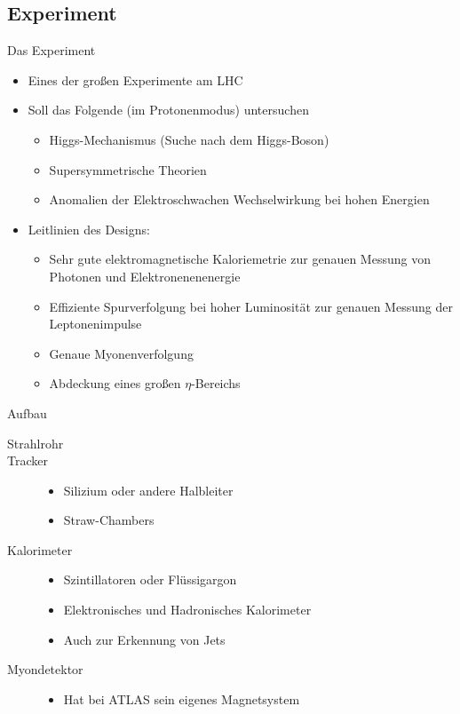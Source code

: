 \documentclass{beamer}
\begin{document}
\subsection{Experiment}
\begin{frame}{Das Experiment}
  \begin{itemize}
    \item Eines der großen Experimente am LHC
    \item Soll das Folgende (im Protonenmodus) untersuchen
      \begin{itemize}
        \item Higgs-Mechanismus (Suche nach dem Higgs-Boson)
        \item Supersymmetrische Theorien
        \item Anomalien der Elektroschwachen Wechselwirkung bei hohen Energien
      \end{itemize} \pause
      \vskip10pt
    \item Leitlinien des Designs:
      \begin{itemize}
        \item Sehr gute elektromagnetische Kaloriemetrie zur genauen Messung von
          Photonen und Elektronenenenergie
        \item Effiziente Spurverfolgung bei hoher Luminosität zur genauen
          Messung der Leptonenimpulse
        \item Genaue Myonenverfolgung 
        \item Abdeckung eines großen $\eta$-Bereichs
      \end{itemize}
  \end{itemize}
\end{frame}

\begin{frame}{Aufbau}
  \begin{description}
    \item[Strahlrohr] %
      \pause
    \item[Tracker]
      \begin{itemize}
        \item Silizium oder andere Halbleiter
        \item Straw-Chambers
      \end{itemize}
      \pause
    \item[Kalorimeter]
      \begin{itemize}
        \item Szintillatoren oder Flüssigargon
        \item Elektronisches und Hadronisches Kalorimeter
        \item Auch zur Erkennung von Jets
      \end{itemize}
      \pause
    \item[Myondetektor]
      \begin{itemize}
        \item Hat bei ATLAS sein eigenes Magnetsystem
      \end{itemize}
  \end{description}
\end{frame}
\end{document}
